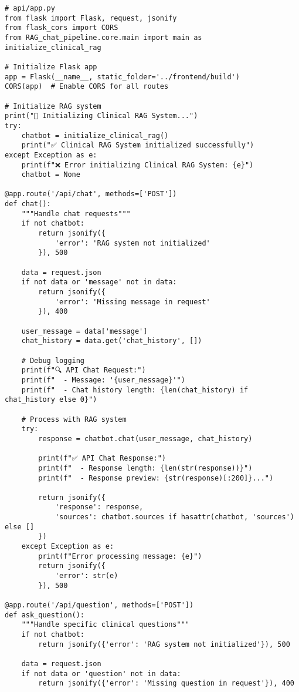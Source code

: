 \begin{verbatim}
# api/app.py
from flask import Flask, request, jsonify
from flask_cors import CORS
from RAG_chat_pipeline.core.main import main as initialize_clinical_rag

# Initialize Flask app
app = Flask(__name__, static_folder='../frontend/build')
CORS(app)  # Enable CORS for all routes

# Initialize RAG system
print("🚀 Initializing Clinical RAG System...")
try:
    chatbot = initialize_clinical_rag()
    print("✅ Clinical RAG System initialized successfully")
except Exception as e:
    print(f"❌ Error initializing Clinical RAG System: {e}")
    chatbot = None

@app.route('/api/chat', methods=['POST'])
def chat():
    """Handle chat requests"""
    if not chatbot:
        return jsonify({
            'error': 'RAG system not initialized'
        }), 500

    data = request.json
    if not data or 'message' not in data:
        return jsonify({
            'error': 'Missing message in request'
        }), 400

    user_message = data['message']
    chat_history = data.get('chat_history', [])

    # Debug logging
    print(f"🔍 API Chat Request:")
    print(f"  - Message: '{user_message}'")
    print(f"  - Chat history length: {len(chat_history) if chat_history else 0}")

    # Process with RAG system
    try:
        response = chatbot.chat(user_message, chat_history)
        
        print(f"✅ API Chat Response:")
        print(f"  - Response length: {len(str(response))}")
        print(f"  - Response preview: {str(response)[:200]}...")

        return jsonify({
            'response': response,
            'sources': chatbot.sources if hasattr(chatbot, 'sources') else []
        })
    except Exception as e:
        print(f"Error processing message: {e}")
        return jsonify({
            'error': str(e)
        }), 500

@app.route('/api/question', methods=['POST'])
def ask_question():
    """Handle specific clinical questions"""
    if not chatbot:
        return jsonify({'error': 'RAG system not initialized'}), 500

    data = request.json
    if not data or 'question' not in data:
        return jsonify({'error': 'Missing question in request'}), 400


\end{verbatim}
